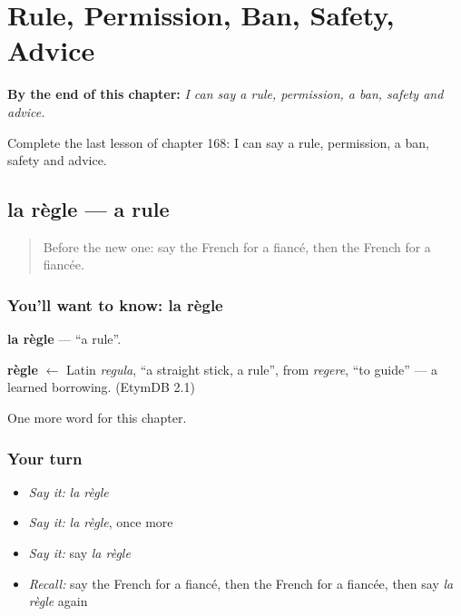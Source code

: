 
\chapter{Rule, Permission, Ban, Safety, Advice}
\label{ch:fr-rule-permission-ban-safety-advice}

\begin{chapteropening}
\textbf{By the end of this chapter:} \emph{I can say a rule, permission, a ban, safety and advice.}

Complete the last lesson of chapter 168: I can say a rule, permission, a ban, safety and advice.
\end{chapteropening}

\section[la règle]{la règle — a rule}

\label{lesson:FR-C168-regle}



\begin{quote}
Before the new one: say the French for a fiancé, then the French for a fiancée.
\end{quote}

\subsection*{You'll want to know: la règle}
\textbf{la règle} — \textquotedblleft{}a rule\textquotedblright{}.

\begin{cousinweb}
\textbf{règle} $\leftarrow$ Latin \emph{regula}, \textquotedblleft{}a straight stick, a rule\textquotedblright{}, from \emph{regere}, \textquotedblleft{}to guide\textquotedblright{} — a learned borrowing. (EtymDB 2.1)
\end{cousinweb}

\begin{grammarlens}[title={What you've built}]
One more word for this chapter.
\end{grammarlens}

\subsection*{Your turn}
\begin{itemize}
\raggedright
  \item \emph{Say it:} \emph{la règle}
  \item \emph{Say it:} \emph{la règle}, once more
  \item \emph{Say it:} say \emph{la règle}
  \item \emph{Recall:} say the French for a fiancé, then the French for a fiancée, then say \emph{la règle} again
\end{itemize}

